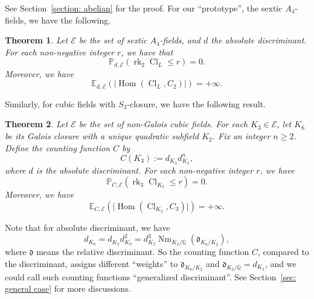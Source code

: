 \documentclass{amsart}
\numberwithin{equation}{section}
\theoremstyle{plain}
\newtheorem{theorem}{Theorem}[section]
\theoremstyle{definition}
\theoremstyle{remark}
\begin{document}
See Section~\ref{section: abelian} for the proof.
For our ``prototype'', the sextic $A_4$-fields, we have the following.
\begin{theorem}\label{thm: S1 dist of class group sextic case}
	Let $\mathcal{E}$ be the set of sextic $A_4$-fields, and $d$ the absolute discriminant.
	For each non-negative integer $r$, we have that
	\begin{equation*}
		\mathbb{P}_{d,\mathcal{E}}(\operatorname{rk}_2\operatorname{Cl}_L\leq r)=0.
	\end{equation*}
	Moreover, we have
	\begin{equation*}
		\mathbb{E}_{d,\mathcal{E}}(\lvert\operatorname{Hom}(\operatorname{Cl}_L,C_2)\rvert)=+\infty.
	\end{equation*}
\end{theorem}
Similarly, for cubic fields with $S_3$-closure, we have the following result.
\begin{theorem}\label{thm: S1 dist of class group cubic case}
    Let $\mathcal{E}$ be the set of non-Galois cubic fields.
    For each $K_3\in\mathcal{E}$, let $K_6$ be its Galois closure with a unique quadratic subfield $K_2$.
    Fix an integer $n\geq2$.
    Define the counting function $C$ by
	\begin{equation*}
		C(K_3):=d_{K_3}d_{K_2}^n,
	\end{equation*}
	where $d$ is the absolute discriminant.
	For each non-negative integer $r$, we have
	\begin{equation*}
		\mathbb{P}_{C,\mathcal{E}}(\operatorname{rk}_3\operatorname{Cl}_{K_3}\leq r)=0.
	\end{equation*}
	Moreover, we have
	\begin{equation*}
		\mathbb{E}_{C,\mathcal{E}}(\lvert\operatorname{Hom}(\operatorname{Cl}_{K_3},C_3)\rvert)=+\infty.
	\end{equation*}
\end{theorem}
Note that for absolute discriminant, we have
\begin{equation*}
	d_{K_6}=d_{K_2}d_{K_3}^2=d_{K_2}^3\operatorname{Nm}_{K_2/\mathbb{Q}}(\mathfrak{d}_{K_6/K_2}),
\end{equation*}
where $\mathfrak{d}$ means the relative discriminant.
So the counting function $C$, compared to the discriminant, assigns different ``weights'' to $\mathfrak{d}_{K_6/K_2}$ and $\mathfrak{d}_{K_2/\mathbb{Q}}=d_{K_2}$,
and we could call such counting functions ``generalized discriminant''.
See Section~\ref{sec: general case} for more discussions.
\end{document}
